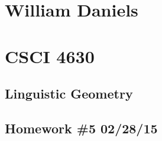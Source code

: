 \documentclass[11pt]{article}
\begin{document}
\begin{center}
\section*{William Daniels}
\section*{CSCI 4630}
\subsection*{Linguistic Geometry}
\subsection*{Homework \#5 02/28/15}
\end{center}

\vspace{.25cm}
\end{document}
